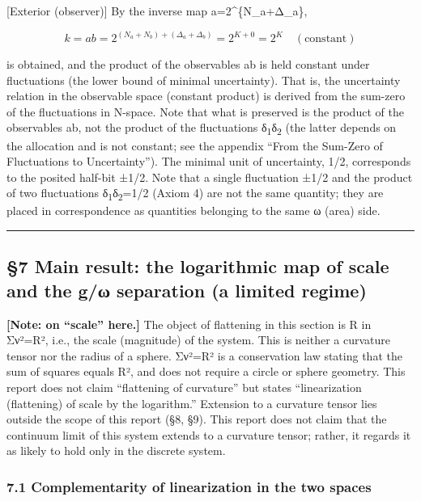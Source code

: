 \documentclass[11pt]{ltjsarticle}
\begin{document}
{[}Exterior (observer){]} By the inverse map a=2\^{}\{N\_a+Δ\_a\},

\[k = ab = 2^{(N_a+N_b)+(\Delta_a+\Delta_b)} = 2^{K+0} = 2^K \quad(\text{constant})\]

is obtained, and the product of the observables ab is held constant
under fluctuations (the lower bound of minimal uncertainty). That is,
the uncertainty relation in the observable space (constant product) is
derived from the sum-zero of the fluctuations in N-space. Note that what
is preserved is the product of the observables ab, not the product of
the fluctuations δ\textsubscript{1}δ\textsubscript{2} (the latter depends on the allocation and is not
constant; see the appendix ``From the Sum-Zero of Fluctuations to
Uncertainty''). The minimal unit of uncertainty, 1/2, corresponds to the
posited half-bit ±1/2. Note that a single fluctuation ±1/2 and the
product of two fluctuations δ\textsubscript{1}δ\textsubscript{2}=1/2 (Axiom 4) are not the same
quantity; they are placed in correspondence as quantities belonging to
the same ω (area) side.

\begin{center}\rule{0.5\linewidth}{0.5pt}\end{center}

\subsection{§7 Main result: the logarithmic map of scale and the g/ω
separation (a limited
regime)}\label{main-result-the-logarithmic-map-of-scale-and-the-gux3c9-separation-a-limited-regime}

\textbf{{[}Note: on ``scale'' here.{]}} The object of flattening in this
section is R in Σν²=R², i.e., the scale (magnitude) of the system. This
is neither a curvature tensor nor the radius of a sphere. Σν²=R² is a
conservation law stating that the sum of squares equals R², and does not
require a circle or sphere geometry. This report does not claim
``flattening of curvature'' but states ``linearization (flattening) of
scale by the logarithm.'' Extension to a curvature tensor lies outside
the scope of this report (§8, §9). This report does not claim that the
continuum limit of this system extends to a curvature tensor; rather, it
regards it as likely to hold only in the discrete system.

\subsubsection{7.1 Complementarity of linearization in the two
spaces}\label{complementarity-of-linearization-in-the-two-spaces}
\end{document}
